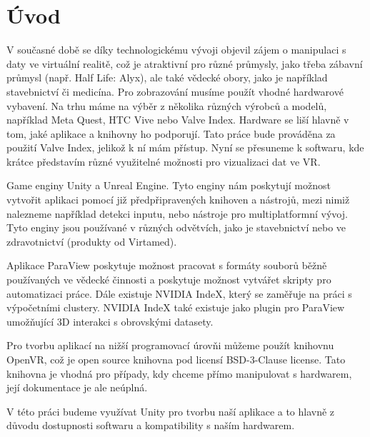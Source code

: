 \documentclass[a4paper,oneside,12pt]{book}
\begin{document}
\chapter*{Úvod} %
%
V současné době se díky technologickému vývoji objevil zájem o manipulaci s daty ve virtuální realitě, což je atraktivní pro různé průmysly, jako třeba zábavní průmysl (např. Half Life: Alyx\cite{EhojVv10CLuHHXEX}), ale také vědecké obory, jako je například stavebnictví\cite{unityvrstavebnictvi} či medicína\cite{virtamed}. Pro zobrazování musíme použít vhodné hardwarové vybavení. Na trhu máme na výběr z několika různých výrobců a modelů, například Meta Quest\cite{metaquest}, HTC Vive\cite{htcvive} nebo Valve Index\cite{valveindex}. Hardware se liší hlavně v tom, jaké aplikace a knihovny ho podporují. Tato práce bude prováděna za použití Valve Index\cite{valveindex}, jelikož k ní mám přístup. Nyní se přesuneme k softwaru, kde krátce představím různé využitelné možnosti pro vizualizaci dat ve VR.
\par{}Game enginy Unity\cite{unityvr} a Unreal Engine\cite{unrealvr}. Tyto enginy nám poskytují možnost vytvořit aplikaci pomocí již předpřipravených knihoven a nástrojů, mezi nimiž nalezneme například detekci inputu\cite{unityvrdokovladani}, nebo nástroje pro multiplatformní vývoj\cite{unitymulti}. Tyto enginy jsou používané v různých odvětvích, jako je stavebnictví\cite{unityvrstavebnictvi} nebo ve zdravotnictví (produkty od Virtamed\cite{virtamed}).
\par{}Aplikace ParaView\cite{paraviewvrdok} poskytuje možnost pracovat s formáty souborů běžně používaných ve vědecké činnosti a poskytuje možnost vytvářet skripty pro automatizaci práce\cite{paraviewscript}. Dále existuje NVIDIA IndeX, který se zaměřuje na práci s výpočetními clustery\cite{nvidiaindex}. NVIDIA IndeX také existuje jako plugin pro ParaView umožňující 3D interakci s obrovskými datasety\cite{nvidiaindexdok}.
\par{}Pro tvorbu aplikací na nižší programovací úrovňi můžeme použít knihovnu OpenVR\cite{openvrdok}, což je open source knihovna pod licensí BSD-3-Clause license\cite{openvrdok}. Tato knihovna je vhodná pro případy, kdy chceme přímo manipulovat s hardwarem\cite{openvrdok}, její dokumentace je ale neúplná.
\par{}V této práci budeme využívat Unity pro tvorbu naší aplikace a to hlavně z důvodu dostupnosti softwaru a kompatibility s naším hardwarem\cite{unitypodpora}.
\end{document}
